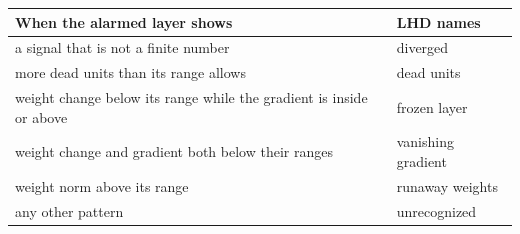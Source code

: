 \begin{tabular}{@{}p{3.9in}l@{}}
\toprule
When the alarmed layer shows & LHD names \\
\midrule
a signal that is not a finite number & diverged \\
more dead units than its range allows & dead units \\
weight change below its range while the gradient is inside or above & frozen layer \\
weight change and gradient both below their ranges & vanishing gradient \\
weight norm above its range & runaway weights \\
any other pattern & unrecognized \\
\bottomrule
\end{tabular}
